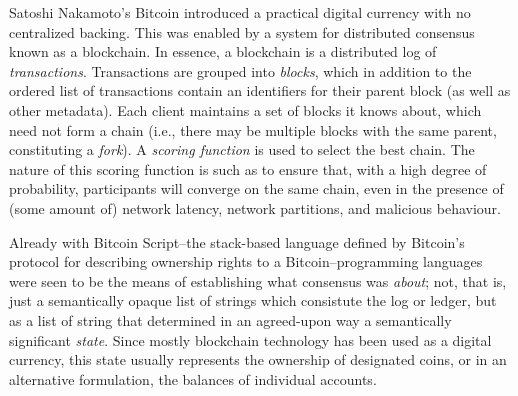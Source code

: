 Satoshi Nakamoto's Bitcoin introduced a practical digital currency with no
centralized backing.\cite{Nakamoto2008} This was enabled by a system for
distributed consensus known as a blockchain. In essence, a blockchain is a
distributed log of \textit{transactions}. Transactions are grouped into
\textit{blocks}, which in addition to the ordered list of transactions
contain an identifiers for their parent block (as well as other metadata). Each
client maintains a set of blocks it knows about, which need not form a chain
(i.e., there may be multiple blocks with the same parent, constituting a
\textit{fork}). A \textit{scoring function} is used to select the best chain.
The nature of this scoring function is such as to ensure that, with a high
degree of probability, participants will converge on the same chain, even in
the presence of (some amount of) network latency, network partitions, and
malicious behaviour.

Already with Bitcoin Script--the stack-based language
defined by Bitcoin's protocol for describing ownership rights to a
Bitcoin--programming languages were seen to be the means of establishing what
consensus was \textit{about}; not, that is, just a semantically opaque list of
strings which consistute the log or ledger, but as a list of string that
determined in an agreed-upon way a semantically significant \textit{state}.
Since mostly blockchain technology has been used as a digital currency, this
state usually represents the ownership of designated coins, or in an
alternative formulation, the balances of individual accounts.


